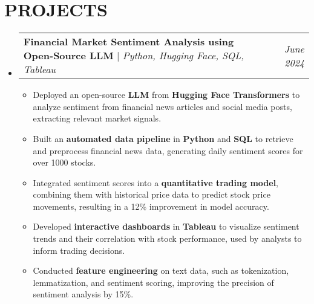 \documentclass[letterpaper,11pt]{article}
\makeatletter
\newcommand{\resumeItem}[1]{
  \item\small{
    {#1 \vspace{-4pt}}
  }
}
\newcommand{\resumeProjectHeading}[2]{
    \item
    \begin{tabular*}{0.95\textwidth}{l@{\extracolsep{\fill}}r}
      \small#1 & #2 \\
    \end{tabular*}\vspace{-7pt}
}
\newcommand{\resumeSubHeadingListStart}{\begin{itemize}[leftmargin=0.15in, label={}]}
\newcommand{\resumeSubHeadingListEnd}{\end{itemize}}
\newcommand{\resumeItemListStart}{\begin{itemize}}
\newcommand{\resumeItemListEnd}{\end{itemize}\vspace{-5pt}}
\makeatother
\begin{document}
\section{\textbf{PROJECTS}}
  \resumeSubHeadingListStart
    \resumeProjectHeading
        {\textbf{Financial Market Sentiment Analysis using Open-Source LLM} $|$ \emph{Python, Hugging Face, SQL, Tableau}}{\textit{June 2024}}
        \resumeItemListStart
          \resumeItem{Deployed an open-source \textbf{LLM} from \textbf{Hugging Face Transformers} to analyze sentiment from financial news articles and social media posts, extracting relevant market signals.}
          \resumeItem{Built an \textbf{automated data pipeline} in \textbf{Python} and \textbf{SQL} to retrieve and preprocess financial news data, generating daily sentiment scores for over 1000 stocks.}
          \resumeItem{Integrated sentiment scores into a \textbf{quantitative trading model}, combining them with historical price data to predict stock price movements, resulting in a 12\% improvement in model accuracy.}
          \resumeItem{Developed \textbf{interactive dashboards} in \textbf{Tableau} to visualize sentiment trends and their correlation with stock performance, used by analysts to inform trading decisions.}
          \resumeItem{Conducted \textbf{feature engineering} on text data, such as tokenization, lemmatization, and sentiment scoring, improving the precision of sentiment analysis by 15\%.}
        \resumeItemListEnd
  \resumeSubHeadingListEnd
\end{document}
